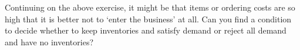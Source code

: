 \begin{exercise}
  Continuing on the above exercise, it might be that items or ordering
  costs are so high that it is better not to `enter the business' at
  all. Can you find a condition to decide whether to keep inventories
  and satisfy demand or reject all demand and have no inventories?

\end{exercise}



